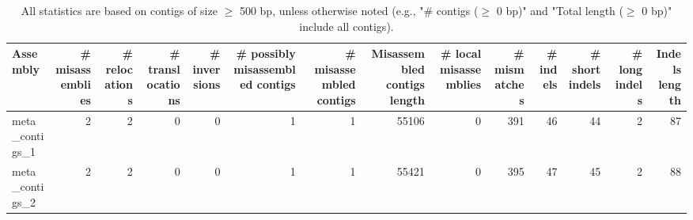 \documentclass[12pt,a4paper]{article}
\begin{document}
\begin{table}[ht]
\begin{center}
\caption{All statistics are based on contigs of size $\geq$ 500 bp, unless otherwise noted (e.g., "\# contigs ($\geq$ 0 bp)" and "Total length ($\geq$ 0 bp)" include all contigs).}
\begin{tabular}{|l*{13}{|r}|}
\hline
Assembly & \# misassemblies &     \# relocations &     \# translocations &     \# inversions & \# possibly misassembled contigs & \# misassembled contigs & Misassembled contigs length & \# local misassemblies & \# mismatches & \# indels &     \# short indels &     \# long indels & Indels length \\ \hline
meta\_contigs\_1 & 2 & 2 & 0 & 0 & 1 & 1 & 55106 & 0 & 391 & 46 & 44 & 2 & 87 \\ \hline
meta\_contigs\_2 & 2 & 2 & 0 & 0 & 1 & 1 & 55421 & 0 & 395 & 47 & 45 & 2 & 88 \\ \hline
\end{tabular}
\end{center}
\end{table}
\end{document}
